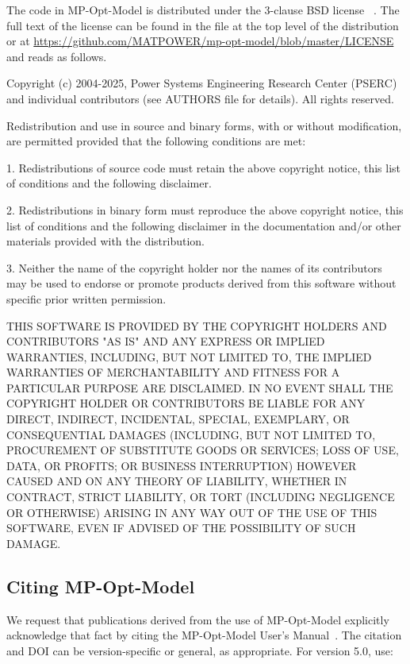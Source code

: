 \documentclass[12pt]{article}
\newcommand{\mpom}[0]{\mbox{MP-Opt-Model}}
\newcommand{\mpomname}[0]{\mpom{}}
\newcommand{\code}[1]{{\relsize{-0.5}{\tt{{#1}}}}}  %
\numberwithin{equation}{section}
\numberwithin{table}{section}
\numberwithin{figure}{section}
\begin{document}
The code in \mpom{} is distributed under the 3-clause BSD license
~\cite{bsd}. The full text of the license can be found in the \code{LICENSE} file at the top level of the distribution or at \url{https://github.com/MATPOWER/mp-opt-model/blob/master/LICENSE} and reads as follows.

\begin{Notice}
Copyright (c) 2004-2025, Power Systems Engineering Research Center
(PSERC) and individual contributors (see AUTHORS file for details).
All rights reserved.

Redistribution and use in source and binary forms, with or without
modification, are permitted provided that the following conditions
are met:

1. Redistributions of source code must retain the above copyright
notice, this list of conditions and the following disclaimer.

2. Redistributions in binary form must reproduce the above copyright
notice, this list of conditions and the following disclaimer in the
documentation and/or other materials provided with the distribution.

3. Neither the name of the copyright holder nor the names of its
contributors may be used to endorse or promote products derived from
this software without specific prior written permission.

THIS SOFTWARE IS PROVIDED BY THE COPYRIGHT HOLDERS AND CONTRIBUTORS
"AS IS" AND ANY EXPRESS OR IMPLIED WARRANTIES, INCLUDING, BUT NOT
LIMITED TO, THE IMPLIED WARRANTIES OF MERCHANTABILITY AND FITNESS
FOR A PARTICULAR PURPOSE ARE DISCLAIMED. IN NO EVENT SHALL THE
COPYRIGHT HOLDER OR CONTRIBUTORS BE LIABLE FOR ANY DIRECT, INDIRECT,
INCIDENTAL, SPECIAL, EXEMPLARY, OR CONSEQUENTIAL DAMAGES (INCLUDING,
BUT NOT LIMITED TO, PROCUREMENT OF SUBSTITUTE GOODS OR SERVICES;
LOSS OF USE, DATA, OR PROFITS; OR BUSINESS INTERRUPTION) HOWEVER
CAUSED AND ON ANY THEORY OF LIABILITY, WHETHER IN CONTRACT, STRICT
LIABILITY, OR TORT (INCLUDING NEGLIGENCE OR OTHERWISE) ARISING IN
ANY WAY OUT OF THE USE OF THIS SOFTWARE, EVEN IF ADVISED OF THE
POSSIBILITY OF SUCH DAMAGE.
\end{Notice}

\clearpage
\subsection{Citing \mpom{}}

We request that publications derived from the use of \mpom{} explicitly acknowledge that fact by citing the \mpomname{} User's Manual~\cite{mpom_manual}.
The citation and DOI can be version-specific or general, as appropriate. For version 5.0, use:
\end{document}

